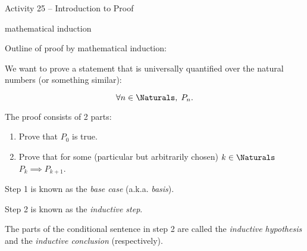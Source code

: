 \documentclass{amsart}
\begin{document}
\thispagestyle{empty}

\centerline{\Large Activity 25 -- Introduction to Proof}
\centerline{\large mathematical induction}

\bigskip
\Large

Outline of proof by mathematical induction:

We want to prove a statement that is universally quantified over the
natural numbers (or something similar):

\[
\forall n \in \Naturals, \; P_n.
\]

The proof consists of 2 parts:
\begin{enumerate}
\item Prove that $P_0$ is true.
\item Prove that for some (particular but arbitrarily chosen) $k \in \Naturals $
$ P_k \implies P_{k+1} $.
\end{enumerate}

Step 1 is known as the {\em base case} (a.k.a. {\em basis}).

Step 2 is known as the {\em inductive step}.

The parts of the conditional sentence in step 2 are called the {\em inductive
hypothesis} and the {\em inductive conclusion} (respectively).

\newpage
\end{document}
